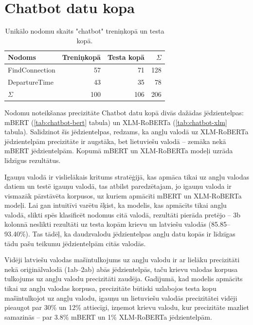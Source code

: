 \section{Chatbot datu kopa}

\begin{table}[htbp]
  \centering
  \caption{Unikālo nodomu skaits "chatbot" treniņkopā un testa kopā.}
    \begin{tabular}{lrrr} \toprule
    Nodoms & Treniņkopā & Testa kopā & $\Sigma$ \\\midrule
    FindConnection & 57    & 71 & 128 \\
    DepartureTime & 43    & 35 & 78 \\
    $\Sigma$ & 100    & 106 & 206 \\\bottomrule
    \end{tabular}%
  \label{tab:chatbot-labels}%
\end{table}%


Nodomu noteikšanas precizitāte Chatbot datu kopā divās dažādas jēdzientelpas: mBERT (\ref{tab:chatbot-bert} tabula) un XLM-RoBERTa (\ref{tab:chatbot-xlm} tabula). Salīdzinot šīs jēdzientelpas, redzams, ka angļu valodā uz XLM-RoBERTa jēdzientelpām precizitāte ir augstāka, bet lietuviešu valodā -- zemāka nekā mBERT jēdzientelpām. Kopumā mBERT un XLM-RoBERTa modeļi uzrāda līdzīgus rezultātus.


Igauņu valodā ir vislielākais kritums stratēģijā, kas apmāca tikai uz angļu valodas datiem un testē igauņu valodā, tas atbilst paredzētajam, jo igauņu valoda ir vismazāk pārstāvēta korpusos, uz kuriem apmācīti mBERT un XLM-RoBERTa modeļi. Lai gan intuitīvi varētu šķist, ka modelis, kas apmācīts tikai angļu valodā, slikti spēs klasificēt nodomus citā valodā, rezultāti pierāda pretējo -- 3b kolonnā neslikti rezultāti uz testa kopām krievu un latviešu valodās (85.85--93.40\%). Tas tādēļ, ka daudzvalodu jēdzientelpas angļu datu kopās ir līdzīgas tādu pašu teikumu jēdzientelpām citās valodās.



Vidēji latviešu valodas mašīntulkojums uz angļu valodu ir ar lielāku precizitāti nekā oriģinālvalodā (1ab--2ab) abās jēdzientelpās, taču krievu valodas korpusa tulkojums uz angļu valodu precizitāti zaudēja. Gadījumā, kad modelis apmācīts tikai uz angļu valodas korpusa, precizitāte būtiski uzlabojos testa kopu mašīntulkojot uz angļu valodu, igauņu un lietuviešu valodās precizitātei vidēji pieaugot par 30\% un 12\% attiecīgi, izņemot krievu valodu, kur precizitāte mazliet samazinās -- par 3.8\% mBERT un 1\% XLM-RoBERTa jēdzientelpām. 

